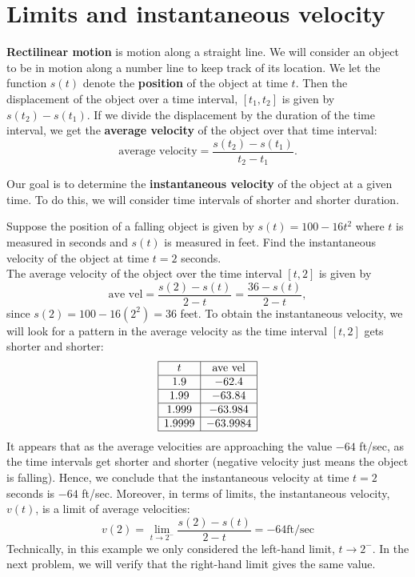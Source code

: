\documentclass[handout]{ximera}
\begin{document}
\section{Limits and instantaneous velocity}


\textbf{Rectilinear motion} is motion along a straight line. We will consider an object to be in motion along a number line to keep track of its location.
We let the function $s(t)$ denote the \textbf{position} of the object at time $t$. Then the displacement of the object over a time interval,
$[t_1, t_2]$ is given by $s(t_2) - s(t_1)$.  If we divide the displacement by the duration of the time interval, we get the 
\textbf{average velocity} of the object over that time interval:
\[
\text{average velocity} = \frac{s(t_2) - s(t_1)}{t_2 -t_1}.
\]


Our goal is to determine the \textbf{instantaneous velocity} of the 
object at a given time.  To do this, we will consider time intervals of shorter and shorter duration.


\begin{example}[example 7]
Suppose the position of a falling object is given by $s(t) = 100-16t^2$ where $t$ is measured in seconds and $s(t)$ is measured in feet.
Find the instantaneous velocity of the object at time $t = 2$ seconds.\\
The average velocity of the object over the time interval $[t,2]$ is given by 
\[
\text{ave vel} = \frac{s(2)-s(t)}{2-t} = \frac{36-s(t)}{2-t},
\]
since $s(2) = 100 - 16(2^2) = 36$ feet.
To obtain the instantaneous velocity, we will look for a pattern in the average velocity as the time interval $[t, 2]$ gets shorter and shorter:
\[
\begin{array}{|c | c|}
	\hline
 t & \text{ave vel}\\
 \hline
  1.9 & -62.4 \\
  \hline
  1.99 & -63.84 \\
  \hline
  1.999 & -63.984 \\
  \hline
  1.9999 & -63.9984\\
  \hline
\end{array}
\]
It appears that as the average velocities are approaching the value $-64$ ft/sec, as the time intervals 
get shorter and shorter (negative velocity just means the object is falling).  Hence, we conclude that the instantaneous velocity at time $t = 2$ seconds is $-64$ ft/sec.
Moreover, in terms of limits, the instantaneous velocity, $v(t)$, is a limit of average velocities:
\[
v(2) = \lim_{t\to 2^-} \frac{s(2) - s(t)}{2-t} = -64 \text{ft/sec}
\]
Technically, in this example we only considered the left-hand limit, $t\to 2^-$.
In the next problem, we will verify that the right-hand limit gives the same value. 
\end{example}
\end{document}
